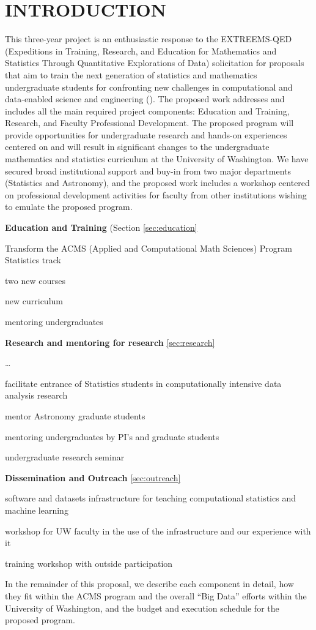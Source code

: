 \section{ INTRODUCTION}

This three-year project is an enthusiastic response to the EXTREEMS-QED (Expeditions in Training, Research, 
and Education for Mathematics and Statistics Through Quantitative Explorations of Data) solicitation for proposals
that aim to train the next generation of statistics and mathematics undergraduate students for confronting new
challenges in computational and data-enabled science and engineering (\cdse).  The proposed work addresses and 
includes all the main required project components: Education and Training, Research, and Faculty Professional 
Development. The proposed program will provide opportunities for undergraduate research and hands-on experiences 
centered on \cdse and will result in significant changes to the undergraduate mathematics and statistics curriculum 
at the University of Washington. We have secured broad institutional support and buy-in from two major departments 
(Statistics and Astronomy), and the proposed work includes a workshop centered on professional development activities
for faculty from other institutions wishing to emulate the proposed program. 

\bits
\item[]{\bf Education and Training} (Section \ref{sec:education} 
\item Transform the ACMS (Applied and Computational Math Sciences) Program Statistics track
  \bits
  \item two new courses
  \item new curriculum 
  \item mentoring undergraduates
  \eits
\item {\bf Research and mentoring for research} \ref{sec:research} 
  \bits
  \item \ldots
  \item facilitate entrance of Statistics students in computationally intensive data analysis research
  \item mentor Astronomy graduate students 
  \item mentoring undergraduates by PI's and graduate students
  \item undergraduate research seminar
  \eits
\item {\bf Dissemination and Outreach} \ref{sec:outreach}
  \bits
  \item software and datasets infrastructure for teaching computational statistics and machine learning 
  \item workshop for UW faculty in the use of the infrastructure and our experience with it
  \item training workshop with outside participation 
  \eits
\eits  


In the remainder of this proposal, we describe each component in
detail, how they fit within the ACMS program and the overall ``Big
Data'' efforts within the University of Washington, and the budget and
execution schedule for the proposed program.



